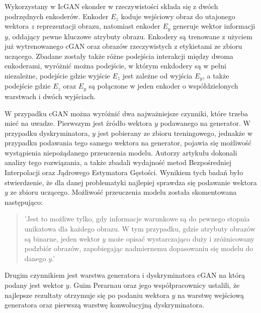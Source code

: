     Wykorzystany w IcGAN ekonder w rzeczywistości składa się z dwóch podrzędnych
    enkoderów. Enkoder $E_{z}$ koduje wejściowy obraz do utajonego wektora $z$ reprezentacji
    obrazu, natomiast enkoder $E_{y}$ generuje wektor informacji $y$, oddający
    pewne kluczowe atrybuty obrazu. Enkodery są trenowane z użyciem już wytrenowanego
    cGAN oraz obrazów rzeczywistych z etykietami ze zbioru uczącego. Zbadane
    zostały także różne podejścia interakcji między dwoma enkoderami, wyróżnić
    można podejście, w którym enkdodery są w pełni niezależne, podejście
    gdzie wyjście $E_{z}$ jest zależne od wyjścia $E_{y}$, a także podejście
    gdzie $E_{z}$ oraz $E_{y}$ są połączone w jeden enkoder o współdzielonych
    warstwach i dwóch wyjściach.

    W przypadku cGAN można wyróżnić dwa najważniejsze czynniki, które trzeba
    mieć na uwadze. Pierwszym jest źródło wektora $y$ podawanego na
    generator. W przypadku dyskryminatora, $y$ jest pobierany ze
    zbioru treningowego, jednakże w przypadku podawania tego
    samego wektora na generator, pojawia się możliwość wystąpienia niepożądanego
    przeuczenia modelu. Autorzy artykułu dokonali analizy tego rozwiązania,
    a także zbadali wydajność metod Bezpośredniej Interpolacji oraz
    Jądrowego Estymatora Gęstości. Wynikiem tych badań było stwierdzenie, że
    dla danej problematyki najlepiej sprawdza się podawanie wektora $y$ ze zbioru
    uczącego. Możliwość przeuczenia modelu została skomentowana następująco:
    \begin{quote}
      'Jest to możliwe tylko, gdy informacje warunkowe są do pewnego stopnia
      unikatowa dla każdego obrazu. W tym przypadku, gdzie atrybuty obrazów są
      binarne, jeden wektor $y$ może opisać wystarczająco duży i zróżnicowany
      podzbiór obrazów, zapobiegając nadmiernemu dopasowaniu się modelu do
      danego $y$.'
    \end{quote}

    Drugim czynnikiem jest warstwa generatora i dyskryminatora cGAN na
    którą podany jest wektor $y$. Guim Perarnau oraz jego współpracownicy ustalili, że najlepsze rezultaty otrzymuje się po podaniu wektora $y$ na warstwę wejściową
    generatora oraz pierwszą warstwę konwolucyjną dyskryminatora.

